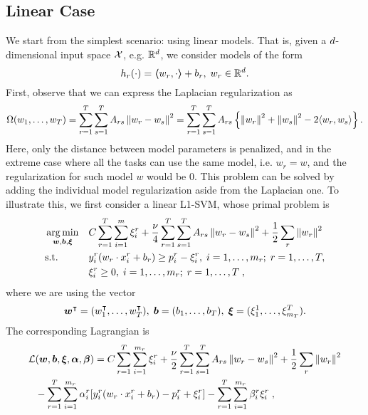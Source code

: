 
\subsection{Linear Case}
We start from the simplest scenario: using linear models. That is, given a $d$-dimensional input space $\mathcal{X}$, e.g. $\mathbb{R}^d$, we consider models of the form
$$ h_r(\cdot) = \bm{\left\langle} w_r, \cdot \bm{\right\rangle} + b_r,\;  w_r \in \mathbb{R}^d .$$
First, observe that we can express the Laplacian regularization as
\begin{equation}
    \nonumber
    \Omega(w_1, \ldots, w_T) = \sum_{r=1}^T \sum_{s=1}^T A_{rs} \left\lVert w_r - w_s\right\rVert^2 =  \sum_{r=1}^T \sum_{s=1}^T A_{rs} \left\{ \left\lVert w_r\right\rVert^2 + \left\lVert w_s\right\rVert^2 - 2 \langle w_r, w_s \rangle \right\}.
\end{equation}
Here, only the distance between model parameters is penalized, and in the extreme case where all the tasks can use the same model, i.e. $w_r = w$, and the regularization for such model $w$ would be $0$.
This problem can be solved by adding the individual model regularization aside from the Laplacian one.
To illustrate this, we first consider a linear L1-SVM, whose primal problem is
\begin{equation}\label{eq:linear_gl_primal}
\begin{aligned}
& \argmin_{\fv{w}, \fv{b}, \fv{\xi}}
& & {C \sum_{r=1}^T \sum_{i=1}^m{\xi_{i}^r} + \frac{\nu}{4} \sum_{r=1}^T \sum_{s=1}^T A_{rs} \norm{w_r - w_s}^2 + \frac{1}{2} \sum_r \norm{w_r}^2 }\\
& \text{s.t.}
& & y_{i}^r ( w_r \cdot x_{i}^r + b_r) \geq p_{i}^r - \xi_{i}^r , \;  i=1,\ldots,m_r; \;  r=1,\ldots,T,\\
& & & \xi_{i}^r \geq 0, \;  i=1,\ldots,m_r; \;  r=1,\ldots,T \; ,
\end{aligned}
\end{equation}
where we are using the vector 
\begin{equation}
    \nonumber
    \bm{w}^\intercal = (w_1^\intercal, \ldots, w_T^\intercal), \; \bm{b} = (b_1, \ldots, b_T), \; \bm{\xi} = (\xi_{1}^1, \ldots, \xi_{m_T}^T).
\end{equation}
The corresponding Lagrangian is
\begin{equation}\label{eq:svmmtl_lagr_GL_addreg}
\begin{aligned}
        \mathcal{L}&(\fv{w}, \fv{b}, \fv{\xi}, \fv{\alpha}, \fv{\beta}) = C \sum_{r=1}^T \sum_{i=1}^{m_r}{\xi_{i}^r} + \frac{\nu}{2} \sum_{r=1}^T \sum_{s=1}^T A_{rs} \norm{w_r - w_s}^2 + \frac{1}{2} \sum_r \norm{w_r}^2 \\
        & - \sum_{r=1}^T \sum_{i=1}^{m_r}{ \alpha_i^r [y_{i}^r (w_r \cdot x_{i}^r + b_r) - p_{i}^r + \xi_{i}^r]   } - \sum_{r=1}^T \sum_{i=1}^{m_r}{ \beta_i^r \xi_i^r } \; ,
\end{aligned}
\end{equation}
